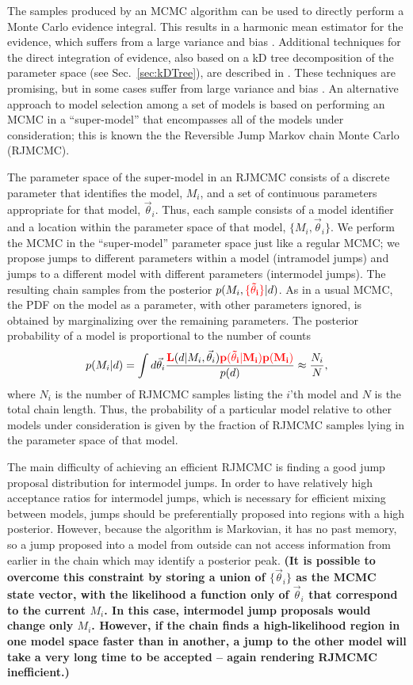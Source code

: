 \documentclass{iopart}
\newcommand{\vtheta}{\vec{\theta}}
\newcommand{\be}{\begin{equation}}
\newcommand{\ee}{\end{equation}}
\newcommand{\ilya}[1]{{\color{red} \bf #1}}
\begin{document}
The samples produced by an MCMC algorithm can be used to directly
perform a Monte Carlo evidence integral.  This results in a harmonic
mean estimator for the evidence, which suffers from a large variance
and bias \cite{NewtonRaftery:1994,Chib:1995,vanHaasteren:2009}.
Additional techniques for the direct integration of evidence, also
based on a kD tree decomposition of the parameter space (see
Sec.~\ref{sec:kDTree}), are described in \cite{Weinberg2009}.  These
techniques are promising, but in some cases suffer 
from large variance and bias \cite{Farr2010}.  An alternative approach to model
selection among a set of models is based on performing an MCMC in a
``super-model'' that encompasses all of the models under
consideration; this is known the the Reversible Jump Markov chain
Monte Carlo (RJMCMC).

The parameter space of the super-model in an RJMCMC consists of a
discrete parameter that identifies the model, $M_i$, and a set of
continuous parameters appropriate for that model, $\vtheta_i$.  Thus,
each sample consists of a model identifier and a location within the
parameter space of that model, $\{M_i, \vtheta_i\}$.  We perform the
MCMC in the ``super-model'' parameter space just like a regular MCMC;
we propose jumps to different parameters within a model (intramodel
jumps) and jumps to a different model with different parameters
(intermodel jumps).  The resulting chain samples from the posterior
$p(M_i,\ilya{\{\vtheta_i\}}|d)$.  As in a usual MCMC, the PDF on the model as a
parameter, with other parameters ignored, is obtained by marginalizing
over the remaining parameters.  The posterior probability of a model
is proportional to the number of counts
%
\be
%
p(M_i|d) = \int d\vtheta_i \frac{\ilya{L}(d|M_i, \vtheta_i) \ilya{p(\vtheta_i|M_i) p(M_i)}}{p(d)}
\approx \frac{N_i}{N},
%
\ee
%
where $N_i$ is the number of RJMCMC samples listing the $i$'th model
and $N$ is the total chain length.  Thus, the probability of a
particular model relative to other models under consideration is given
by the fraction of RJMCMC samples lying in the parameter space of that
model.
 
The main difficulty of achieving an efficient RJMCMC is finding a good
jump proposal distribution for intermodel jumps.  In order to have
relatively high acceptance ratios for intermodel jumps, which is
necessary for efficient mixing between models, jumps should be
preferentially proposed into regions with a high posterior.  However,
because the algorithm is Markovian, it has no past memory, so a jump
proposed into a model from outside can not access information from
earlier in the chain which may identify a posterior peak. \ilya{(It is possible to overcome this constraint
by storing a union of $\{\vtheta_i\}$ as the MCMC state vector, with the likelihood a function only of $\vtheta_i$ that correspond to the current $M_i$.  In this case, intermodel jump proposals would change only $M_i$.  However, if the chain finds a high-likelihood region in one model space faster than in another, a jump to the other model will take a very long time to be accepted -- again rendering RJMCMC inefficient.)}
\end{document}
